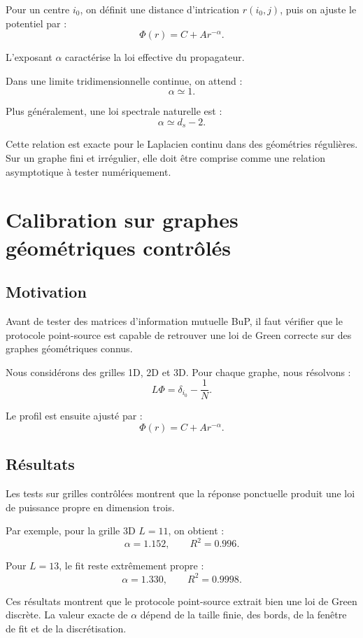 \documentclass[11pt,a4paper]{article}
\begin{document}
Pour un centre \(i_0\), on définit une distance d'intrication \(r(i_0,j)\), puis
on ajuste le potentiel par :
\[
\Phi(r)
=
C
+
A r^{-\alpha}.
\]

L'exposant \(\alpha\) caractérise la loi effective du propagateur.

Dans une limite tridimensionnelle continue, on attend :
\[
\alpha\simeq1.
\]

Plus généralement, une loi spectrale naturelle est :
\[
\alpha
\simeq
d_s-2.
\]

Cette relation est exacte pour le Laplacien continu dans des géométries
régulières. Sur un graphe fini et irrégulier, elle doit être comprise comme une
relation asymptotique à tester numériquement.

\section{Calibration sur graphes géométriques contrôlés}

\subsection{Motivation}

Avant de tester des matrices d'information mutuelle BuP, il faut vérifier que
le protocole point-source est capable de retrouver une loi de Green correcte
sur des graphes géométriques connus.

Nous considérons des grilles 1D, 2D et 3D. Pour chaque graphe, nous résolvons :
\[
L\Phi
=
\delta_{i_0}
-
\frac{1}{N}.
\]

Le profil est ensuite ajusté par :
\[
\Phi(r)=C+A r^{-\alpha}.
\]

\subsection{Résultats}

Les tests sur grilles contrôlées montrent que la réponse ponctuelle produit une
loi de puissance propre en dimension trois.

Par exemple, pour la grille 3D \(L=11\), on obtient :
\[
\alpha=1.152,
\qquad
R^2=0.996.
\]

Pour \(L=13\), le fit reste extrêmement propre :
\[
\alpha=1.330,
\qquad
R^2=0.9998.
\]

Ces résultats montrent que le protocole point-source extrait bien une loi de
Green discrète. La valeur exacte de \(\alpha\) dépend de la taille finie, des
bords, de la fenêtre de fit et de la discrétisation.
\end{document}

